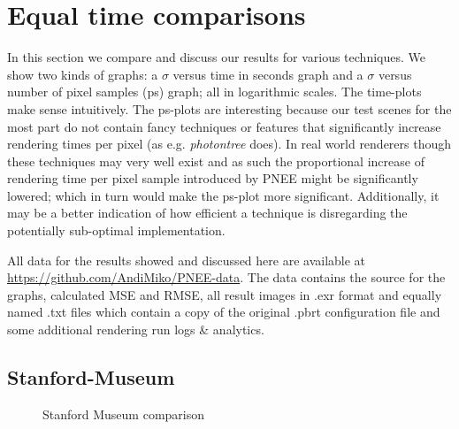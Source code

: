 \label{ch:ev:cdftree}


\label{ch:ev:photonsampling}


\label{ch:ev:uniformfloor}


\section{Equal time comparisons}

In this section we compare and discuss our results for various techniques. We show two kinds of graphs: a $\sigma$ versus time in seconds graph and a $\sigma$ versus number of pixel samples (ps) graph; all in logarithmic scales. The time-plots make sense intuitively. The ps-plots are interesting because our test scenes for the most part do not contain fancy techniques or features that significantly increase rendering times per pixel (as e.g. \textit{photontree} does). In real world renderers though these techniques may very well exist and as such the proportional increase of rendering time per pixel sample introduced by PNEE might be significantly lowered; which in turn would make the ps-plot more significant. Additionally, it may be a better indication of how efficient a technique is disregarding the potentially sub-optimal implementation.

All data for the results showed and discussed here are available at \url{https://github.com/AndiMiko/PNEE-data}. The data contains the source for the graphs, calculated MSE and RMSE, all result images in .exr format and equally named .txt files which contain a copy of the original .pbrt configuration file and some additional rendering run logs \& analytics.

\subsection{Stanford-Museum}

\begin{figure}
    \centering
    \begin{subfigure}{.5\textwidth}
      \centering
        \caption{}
        \label{fig:smmain_t}
    \end{subfigure}%
    \begin{subfigure}{.5\textwidth}
        \caption{}
        \label{fig:smmain_ps}
    \end{subfigure}
    \caption{Stanford Museum comparison}
    \label{fig:smmain}
\end{figure}


